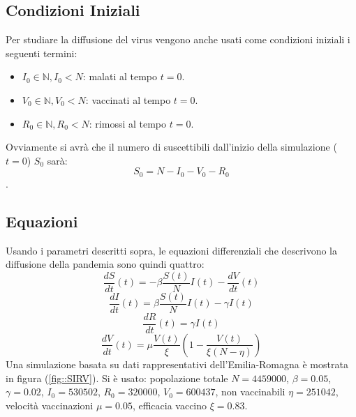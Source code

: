 \documentclass{article}
\begin{document}
\subsection{Condizioni Iniziali}
Per studiare la diffusione del virus vengono anche usati come 
condizioni iniziali i seguenti termini:
\begin{itemize}
\item $I_0 \in \mathbb{N}, I_0 < N$: malati al tempo $t = 0$.
\item $V_0 \in \mathbb{N}, V_0 < N $: vaccinati al tempo $t = 0$.
\item $R_0 \in \mathbb{N}, R_0 < N $: rimossi al tempo $t = 0$.
\end{itemize}
Ovviamente si avrà che il numero di suscettibili dall'inizio della 
simulazione ($t = 0$) $S_0$ sarà: \\
$$S_0 = N - I_0 - V_0 - R_0$$.\\
\subsection{Equazioni}
Usando i parametri descritti sopra, le equazioni differenziali che 
descrivono la diffusione della pandemia sono quindi quattro:\\
\begin{equation} \label{eq::S}
\frac{dS}{dt}(t)= -\beta \frac{S(t)}{N}I(t) - \frac{dV}{dt}(t)
\end{equation}
\begin{equation}\label{eq::I}
\frac{dI}{dt}(t)= \beta \frac{S(t)}{N}I(t) - \gamma I(t)
\end{equation}
\begin{equation}\label{eq::R}
\frac{dR}{dt}(t)= \gamma I(t)
\end{equation}
\begin{equation}\label{eq::V}
\frac{dV}{dt}(t)= \mu\frac{V(t)}{\xi}\left( 1-\frac{V(t)}{\xi(N-\eta)}\right)
\end{equation}
Una simulazione basata su dati rappresentativi dell'Emilia-Romagna
 è mostrata in figura (\ref{fig::SIRV}). 
 Si è usato: popolazione totale $N=4459000$, $\beta=0.05$, 
 $\gamma=0.02$, $I_0 = 530502$, $R_0 = 320000$, $V_0 = 600437$,
 non vaccinabili $\eta = 251042$, 
 velocità vaccinazioni $\mu = 0.05$, efficacia 
 vaccino $\xi= 0.83$.
\end{document}
